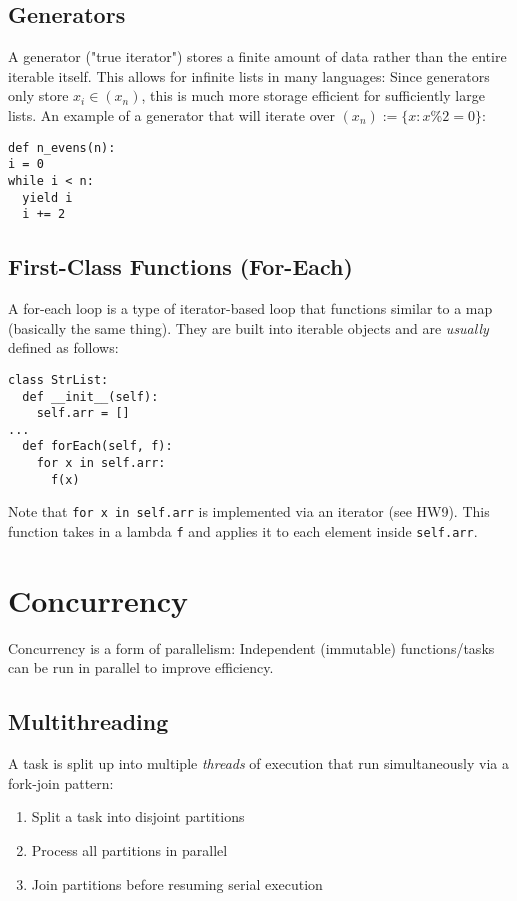 \documentclass{article}
\begin{document}
\subsection{Generators}
A generator ("true iterator") stores a finite amount of data rather
than the entire iterable itself. This allows for infinite lists in
many languages: Since generators only store $x_i \in (x_n)$, this is
much more storage efficient for sufficiently large lists. An example
of a generator that will iterate over $(x_n) := \{x : x \% 2 = 0\}$:
\begin{verbatim}
def n_evens(n):
i = 0
while i < n:
  yield i
  i += 2
\end{verbatim}

\subsection{First-Class Functions (For-Each)}
A for-each loop is a type of iterator-based loop that functions
similar to a map (basically the same thing). They are built into
iterable objects and are \textit{usually} defined as follows:
\begin{verbatim}
class StrList:
  def __init__(self):
    self.arr = []
...
  def forEach(self, f):
    for x in self.arr:
      f(x)
\end{verbatim}
Note that \texttt{for x in self.arr} is implemented via an iterator
(see HW9). This function takes in a lambda \texttt{f} and applies it
to each element inside \texttt{self.arr}.





\section{Concurrency}
Concurrency is a form of parallelism: Independent (immutable)
functions/tasks can be run in parallel to improve efficiency.

\subsection{Multithreading}
A task is split up into multiple \textit{threads} of
execution that run simultaneously via a fork-join pattern:
\begin{enumerate}[label=(\roman*)]
\item Split a task into disjoint partitions
\item Process all partitions in parallel
\item Join partitions before resuming serial execution
\end{enumerate}
\end{document}
